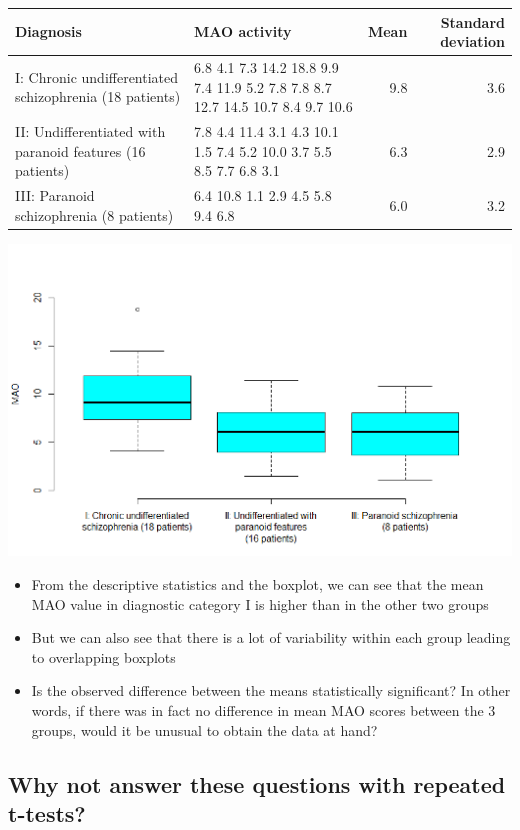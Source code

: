 \documentclass[
]{book}
\providecommand{\tightlist}{%
  \setlength{\itemsep}{0pt}\setlength{\parskip}{0pt}}
\begin{document}
\begin{tabular}{l|l|r|r}
\hline
Diagnosis & MAO activity & Mean & Standard deviation\\
\hline
I: Chronic undifferentiated schizophrenia (18 patients) & 6.8 4.1 7.3 14.2 18.8 9.9 7.4 11.9 5.2 7.8 7.8 8.7 12.7 14.5 10.7 8.4 9.7 10.6 & 9.8 & 3.6\\
\hline
II: Undifferentiated with paranoid features (16 patients) & 7.8 4.4 11.4 3.1 4.3 10.1 1.5 7.4 5.2 10.0 3.7 5.5 8.5 7.7 6.8 3.1 & 6.3 & 2.9\\
\hline
III: Paranoid schizophrenia (8 patients) & 6.4 10.8 1.1 2.9 4.5 5.8 9.4 6.8 & 6.0 & 3.2\\
\hline
\end{tabular}

\includegraphics[width=1\linewidth]{./10_6}

\begin{itemize}
\tightlist
\item
  From the descriptive statistics and the boxplot, we can see that the mean MAO value in diagnostic category I is higher than in the other two groups
\item
  But we can also see that there is a lot of variability within each group leading to overlapping boxplots
\item
  Is the observed difference between the means statistically significant? In other words, if there was in fact no difference in mean MAO scores between the 3 groups, would it be unusual to obtain the data at hand?
\end{itemize}

\hypertarget{why-not-answer-these-questions-with-repeated-t-tests}{%
\subsection{Why not answer these questions with repeated t-tests?}\label{why-not-answer-these-questions-with-repeated-t-tests}}
\end{document}
